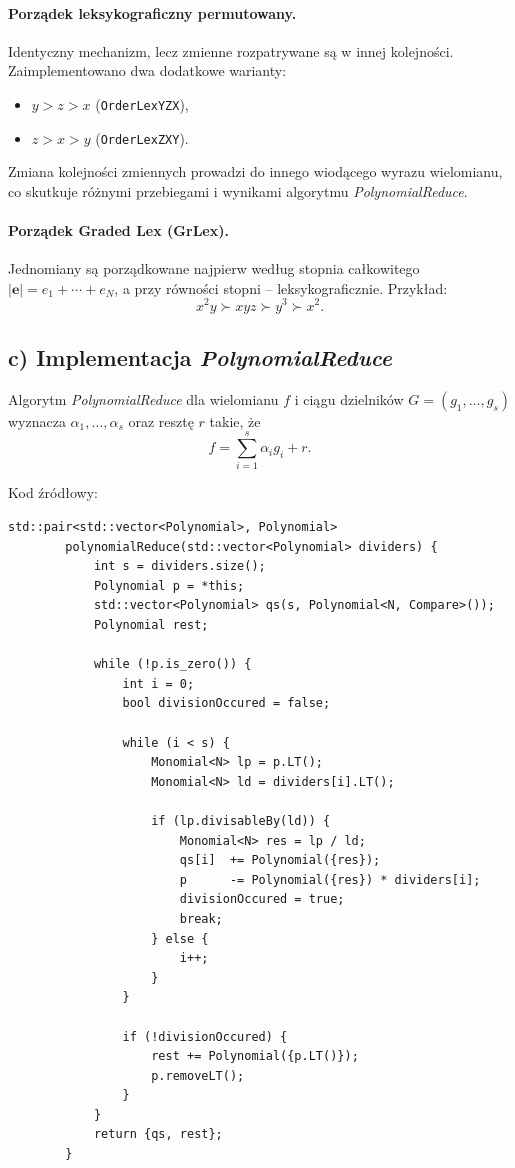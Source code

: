\documentclass[12pt,a4paper]{article}
\begin{document}
	\paragraph{Porządek leksykograficzny permutowany.}
	Identyczny mechanizm, lecz zmienne rozpatrywane są w innej kolejności.
	Zaimplementowano dwa dodatkowe warianty:
	\begin{itemize}
		\item $y > z > x$ (\texttt{OrderLexYZX}),
		\item $z > x > y$ (\texttt{OrderLexZXY}).
	\end{itemize}
	Zmiana kolejności zmiennych prowadzi do innego wiodącego wyrazu wielomianu, co skutkuje
	różnymi przebiegami i wynikami algorytmu \textit{PolynomialReduce}.
	
	\paragraph{Porządek Graded Lex (GrLex).}
	Jednomiany są porządkowane najpierw według stopnia całkowitego
	$|\mathbf{e}| = e_1 + \cdots + e_N$, a przy równości stopni -- leksykograficznie.
	Przykład:
	\[
	x^2 y \succ x y z \succ y^3 \succ x^2.
	\]
	
	
	\subsection{c) Implementacja \textit{PolynomialReduce}}
	
	Algorytm \textit{PolynomialReduce} dla wielomianu $f$ i ciągu dzielników
	$G = (g_1,\ldots,g_s)$ wyznacza $\alpha_1,\ldots,\alpha_s$ oraz resztę $r$ takie, że
	\[
	f = \sum_{i=1}^{s} \alpha_i g_i + r.
	\]
	
	Kod źródłowy:
	
	\begin{lstlisting}[caption={Metoda \texttt{polynomialReduce} (plik \texttt{Polynomial.hpp})}]
		std::pair<std::vector<Polynomial>, Polynomial>
		polynomialReduce(std::vector<Polynomial> dividers) {
			int s = dividers.size();
			Polynomial p = *this;
			std::vector<Polynomial> qs(s, Polynomial<N, Compare>());
			Polynomial rest;
			
			while (!p.is_zero()) {
				int i = 0;
				bool divisionOccured = false;
				
				while (i < s) {
					Monomial<N> lp = p.LT();
					Monomial<N> ld = dividers[i].LT();
					
					if (lp.divisableBy(ld)) {
						Monomial<N> res = lp / ld;
						qs[i]  += Polynomial({res});
						p      -= Polynomial({res}) * dividers[i];
						divisionOccured = true;
						break;
					} else {
						i++;
					}
				}
				
				if (!divisionOccured) {
					rest += Polynomial({p.LT()});
					p.removeLT();
				}
			}
			return {qs, rest};
		}
	\end{lstlisting}
	
\end{document}
